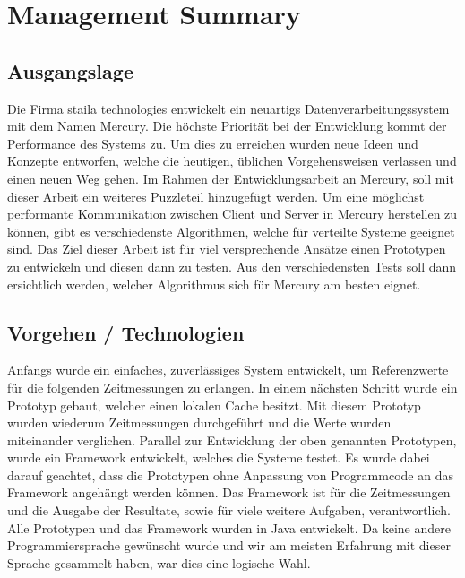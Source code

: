 \section*{Management Summary}

\subsection*{Ausgangslage}
Die Firma staila technologies entwickelt ein neuartigs Datenverarbeitungssystem mit dem Namen Mercury. Die höchste Priorität bei der Entwicklung kommt der Performance des Systems zu. Um dies zu erreichen wurden neue Ideen und Konzepte entworfen, welche die heutigen, üblichen Vorgehensweisen verlassen und einen neuen Weg gehen. \newline
Im Rahmen der Entwicklungsarbeit an Mercury, soll mit dieser Arbeit ein weiteres Puzzleteil hinzugefügt werden. Um eine möglichst performante Kommunikation zwischen Client und Server in Mercury herstellen zu können, gibt es verschiedenste Algorithmen, welche für verteilte Systeme geeignet sind. Das Ziel dieser Arbeit ist für viel versprechende Ansätze einen Prototypen zu entwickeln und diesen dann zu testen. Aus den verschiedensten Tests soll dann ersichtlich werden, welcher Algorithmus sich für Mercury am besten eignet.\newline
\subsection*{Vorgehen / Technologien}
Anfangs wurde ein einfaches, zuverlässiges System entwickelt, um Referenzwerte für die folgenden Zeitmessungen zu erlangen. In einem nächsten Schritt wurde ein Prototyp gebaut, welcher einen lokalen Cache besitzt. Mit diesem Prototyp wurden wiederum Zeitmessungen durchgeführt und die Werte wurden miteinander verglichen.\newline
Parallel zur Entwicklung der oben genannten Prototypen, wurde ein Framework entwickelt, welches die Systeme testet. Es wurde dabei darauf geachtet, dass die Prototypen ohne Anpassung von Programmcode an das Framework angehängt werden können. Das Framework ist für die Zeitmessungen und die Ausgabe der Resultate, sowie für viele weitere Aufgaben, verantwortlich.\newline
Alle Prototypen und das Framework wurden in Java entwickelt. Da keine andere Programmiersprache gewünscht wurde und wir am meisten Erfahrung mit dieser Sprache gesammelt haben, war dies eine logische Wahl. \newline
